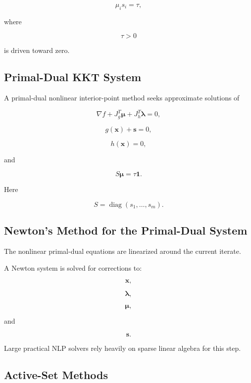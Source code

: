\[
\boxed{
\mu_i s_i
=
\tau,
}
\]

where

\[
\tau>0
\]

is driven toward zero.

\subsection{Primal-Dual KKT System}
\label{subsec:nlp-primal-dual-kkt}

A primal-dual nonlinear interior-point method seeks approximate
solutions of

\[
\boxed{
\nabla f
+
J_g^T\boldsymbol{\mu}
+
J_h^T\boldsymbol{\lambda}
=
0,
}
\]

\[
\boxed{
g(\mathbf{x})+\mathbf{s}=0,
}
\]

\[
\boxed{
h(\mathbf{x})=0,
}
\]

and

\[
\boxed{
S\boldsymbol{\mu}
=
\tau\mathbf{1}.
}
\]

Here

\[
S
=
\operatorname{diag}(s_1,\ldots,s_m).
\]

\subsection{Newton's Method for the Primal-Dual System}
\label{subsec:nlp-primal-dual-newton}

The nonlinear primal-dual equations are linearized around the current
iterate.

A Newton system is solved for corrections to:

\[
\boxed{
\mathbf{x},
}
\]

\[
\boxed{
\boldsymbol{\lambda},
}
\]

\[
\boxed{
\boldsymbol{\mu},
}
\]

and

\[
\boxed{
\mathbf{s}.
}
\]

Large practical NLP solvers rely heavily on sparse linear algebra for this
step.

\subsection{Active-Set Methods}
\label{subsec:nlp-active-set-methods}

